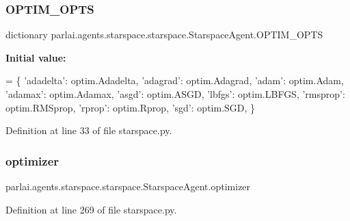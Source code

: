 \subsubsection{\texorpdfstring{O\+P\+T\+I\+M\+\_\+\+O\+P\+TS}{OPTIM\_OPTS}}
{\footnotesize\ttfamily dictionary parlai.\+agents.\+starspace.\+starspace.\+Starspace\+Agent.\+O\+P\+T\+I\+M\+\_\+\+O\+P\+TS\hspace{0.3cm}{\ttfamily [static]}}

{\bfseries Initial value\+:}
\begin{DoxyCode}
=  \{
        \textcolor{stringliteral}{'adadelta'}: optim.Adadelta,
        \textcolor{stringliteral}{'adagrad'}: optim.Adagrad,
        \textcolor{stringliteral}{'adam'}: optim.Adam,
        \textcolor{stringliteral}{'adamax'}: optim.Adamax,
        \textcolor{stringliteral}{'asgd'}: optim.ASGD,
        \textcolor{stringliteral}{'lbfgs'}: optim.LBFGS,
        \textcolor{stringliteral}{'rmsprop'}: optim.RMSprop,
        \textcolor{stringliteral}{'rprop'}: optim.Rprop,
        \textcolor{stringliteral}{'sgd'}: optim.SGD,
    \}
\end{DoxyCode}


Definition at line 33 of file starspace.\+py.

\mbox{\label{classparlai_1_1agents_1_1starspace_1_1starspace_1_1StarspaceAgent_afacbbd91785631f9b23fd0fbd9b4cc21}} 
\subsubsection{\texorpdfstring{optimizer}{optimizer}}
{\footnotesize\ttfamily parlai.\+agents.\+starspace.\+starspace.\+Starspace\+Agent.\+optimizer}



Definition at line 269 of file starspace.\+py.

\mbox{\label{classparlai_1_1agents_1_1starspace_1_1starspace_1_1StarspaceAgent_a9c521ca705e241271b6bb34bd5b22bea}} 
